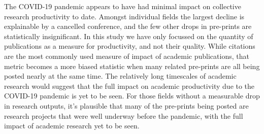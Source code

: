 \documentclass[a4paper,12pt]{article}
\begin{document}
The COVID-19 pandemic appears to have had minimal impact on collective research productivity to date. 
Amongst individual fields the largest decline is explainable by a cancelled conference, and the few other drops in pre-prints are statistically insignificant. 
In this study we have only focussed on the quantity of publications as a measure for productivity, and not their quality. While citations are the most commonly used measure of impact of academic publications, that metric becomes a more biased statistic when many related pre-prints are all being posted nearly at the same time\cite{Fassin:2021}.
The relatively long timescales of academic research would suggest that the full impact on academic productivity due to the COVID-19 pandemic is yet to be seen. For those fields without a measurable drop in research outputs, it's plausible that many of the pre-prints being posted are research projects that were well underway before the pandemic, with the full impact of academic research yet to be seen.
\end{document}
